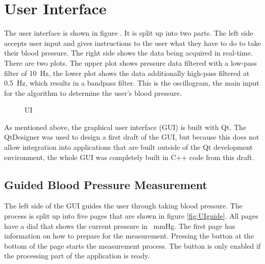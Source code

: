 %
%



\section{User Interface}
The user interface is shown in figure . It is split up into two parts. The left side accepts user input and gives instructions to the user what they have to do to take their blood pressure. The right side shows the data being acquired in real-time. There are two plots. The upper plot shows pressure data filtered with a low-pass filter of \SI{10}{\Hz}, the lower plot shows the data additionally high-pass filtered at \SI{0.5}{\Hz}, which results in a bandpass filter. This is the oscillogram, the main input for the algorithm to determine the user's blood pressure.

\begin{figure}
\centering
\caption{UI}
\label{fig:UI}
\end{figure}

As mentioned above, the graphical user interface (GUI) is built with Qt.
The QtDesigner was used to design a first draft of the GUI, but because this does not allow integration into applications that are built outside of the Qt development environment, the whole GUI was completely built in C++ code from this draft.

\subsection{Guided Blood Pressure Measurement}
The left side of the GUI guides the user through taking blood pressure. The process is split up into five pages that are shown in figure \ref{fig:UIguide}.  All pages have a dial that shows the current pressure in \SI{}{\mmHg}. The first page has information on how to prepare for the measurement. Pressing the button at the bottom of the page starts the measurement process. The button is only enabled if the processing part of the application is ready.

